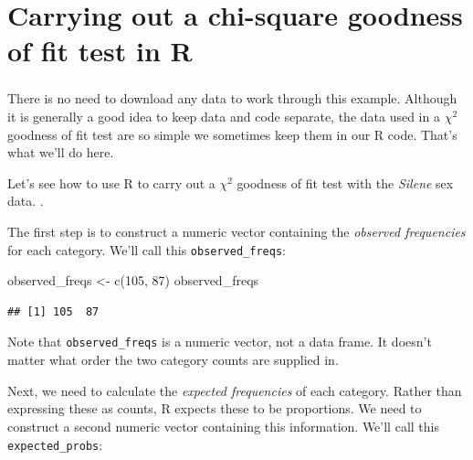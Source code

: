 \documentclass[
]{book}
\newenvironment{Shaded}{\begin{snugshade}}{\end{snugshade}}
\newcommand{\DecValTok}[1]{\textcolor[rgb]{0.00,0.00,0.81}{#1}}
\newcommand{\FunctionTok}[1]{\textcolor[rgb]{0.00,0.00,0.00}{#1}}
\newcommand{\NormalTok}[1]{#1}
\newcommand{\OtherTok}[1]{\textcolor[rgb]{0.56,0.35,0.01}{#1}}
\newenvironment{greybox}{
  \definecolor{shadecolor}{rgb}{0.95,0.95,0.95}  %
  \color{black}
  \begin{shaded}}
 {\end{shaded}}
\newenvironment{infobox}[1]
  {
  \begin{itemize}
  \renewcommand{\labelitemi}{
    \raisebox{-.7\height}[0pt][0pt]{
      {\setkeys{Gin}{width=3em,keepaspectratio}
        \texttt{[image: images/\#1]}}
    }
  }
  \setlength{\fboxsep}{1em}
  \begin{greybox}
  \item
  }
  {
  \end{greybox}
  \end{itemize}
  }
\begin{document}
\hypertarget{carrying-out-a-chi-square-goodness-of-fit-test-in-r}{%
\section{Carrying out a chi-square goodness of fit test in R}\label{carrying-out-a-chi-square-goodness-of-fit-test-in-r}}

\begin{infobox}{action}

\hypertarget{section-19}{%
\subsubsection*{}\label{section-19}}

There is no need to download any data to work through this example. Although it is generally a good idea to keep data and code separate, the data used in a \(\chi^{2}\) goodness of fit test are so simple we sometimes keep them in our R code. That's what we'll do here.

\end{infobox}

Let's see how to use R to carry out a \(\chi^{2}\) goodness of fit test with the \emph{Silene} sex data. .

The first step is to construct a numeric vector containing the \emph{observed frequencies} for each category. We'll call this \texttt{observed\_freqs}:

\begin{Shaded}
\begin{Highlighting}[]
\NormalTok{observed\_freqs }\OtherTok{\textless{}{-}} \FunctionTok{c}\NormalTok{(}\DecValTok{105}\NormalTok{, }\DecValTok{87}\NormalTok{)}
\NormalTok{observed\_freqs}
\end{Highlighting}
\end{Shaded}

\begin{verbatim}
## [1] 105  87
\end{verbatim}

Note that \texttt{observed\_freqs} is a numeric vector, not a data frame. It doesn't matter what order the two category counts are supplied in.

Next, we need to calculate the \emph{expected frequencies} of each category. Rather than expressing these as counts, R expects these to be proportions. We need to construct a second numeric vector containing this information. We'll call this \texttt{expected\_probs}:
\end{document}
